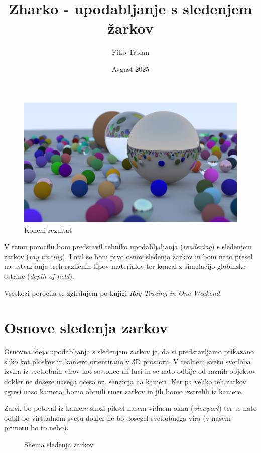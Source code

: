 \documentclass[12pt, a4paper]{article}
\title{Zharko - upodabljanje s sledenjem žarkov}
\author{Filip Trplan}
\date{Avgust 2025}
\begin{document}
\maketitle

\begin{figure}[h]
	\centering
	\includegraphics[width=\textwidth]{cover}
	\caption{Koncni rezultat}
\end{figure}

V temu porocilu bom predstavil tehniko upodabljaljanja (\textit{rendering}) s sledenjem zarkov
(\textit{ray tracing}). Lotil se bom prvo osnov sledenja zarkov in bom nato presel na ustvarjanje treh
razlicnih tipov materialov ter koncal z simulacijo globinske ostrine (\textit{depth of field}).

Vseskozi porocila se zgledujem po knjigi \textit{Ray Tracing in One Weekend} \cite{Shirley2025RTW1}

\section{Osnove sledenja zarkov}

Osnovna ideja upodabljanja s sledenjem zarkov je, da si predstavljamo prikazano sliko kot ploskev in kamero
orientirano v 3D prostoru. V realnem svetu svetloba izvira iz svetlobnih virov kot so sonce ali luci in se
nato odbije od raznih objektov dokler ne doseze nasega ocesa oz. senzorja na kameri. Ker pa veliko teh zarkov
zgresi naso kamero, bomo obrnili smer zarkov in jih bomo izstrelili iz kamere.

Zarek bo potoval iz kamere skozi piksel nasem vidnem oknu (\textit{viewport}) ter se nato odbil po
virtualnem svetu dokler ne bo dosegel svetlobnega vira (v nasem primeru bo to nebo).

\begin{figure}[h]

	\caption{Shema sledenja zarkov}
\end{figure}
\end{document}
